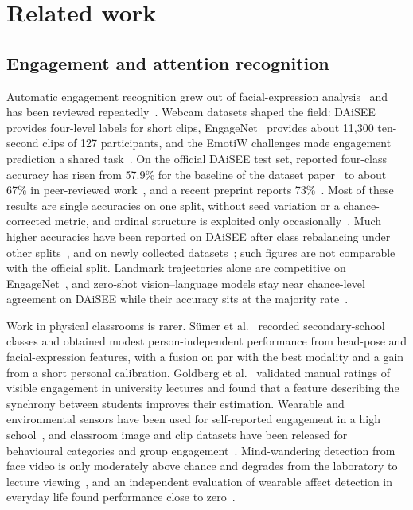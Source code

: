 \section{Related work}
\label{sec:related}

\subsection{Engagement and attention recognition}
Automatic engagement recognition grew out of facial-expression analysis~\cite{whitehill2014faces} and has been reviewed repeatedly~\cite{karimah2022automatic,booth2023engagement,qarbal2025student}. Webcam datasets shaped the field: DAiSEE~\cite{gupta2016daisee} provides four-level labels for short clips, EngageNet~\cite{singh2023engagenet} provides about 11{,}300 ten-second clips of 127 participants, and the EmotiW challenges made engagement prediction a shared task~\cite{dhall2018emotiw,dhall2020emotiw}. On the official DAiSEE test set, reported four-class accuracy has risen from 57.9\% for the baseline of the dataset paper~\cite{gupta2016daisee} to about 67\% in peer-reviewed work~\cite{liao2021dfstn,abedi2021resnettcn,selim2022students,abedi2024affectordinal,abedi2025supervised}, and a recent preprint reports 73\%~\cite{gothwal2025vibednet}. Most of these results are single accuracies on one split, without seed variation or a chance-corrected metric, and ordinal structure is exploited only occasionally~\cite{abedi2024affectordinal,abedi2025supervised}. Much higher accuracies have been reported on DAiSEE after class rebalancing under other splits~\cite{santoni2024automatic}, and on newly collected datasets~\cite{selim2022students}; such figures are not comparable with the official split. Landmark trajectories alone are competitive on EngageNet~\cite{yulius2026student}, and zero-shot vision--language models stay near chance-level agreement on DAiSEE while their accuracy sits at the majority rate~\cite{goyal2026zeroshot}.

Work in physical classrooms is rarer. S\"umer et al.~\cite{sumer2023multimodal} recorded secondary-school classes and obtained modest person-independent performance from head-pose and facial-expression features, with a fusion on par with the best modality and a gain from a short personal calibration. Goldberg et al.~\cite{goldberg2021attentive} validated manual ratings of visible engagement in university lectures and found that a feature describing the synchrony between students improves their estimation. Wearable and environmental sensors have been used for self-reported engagement in a high school~\cite{gao2020ngage}, and classroom image and clip datasets have been released for behavioural categories and group engagement~\cite{xu2023icapd,lu2025video}. Mind-wandering detection from face video is only moderately above chance and degrades from the laboratory to lecture viewing~\cite{buhler2025lab}, and an independent evaluation of wearable affect detection in everyday life found performance close to zero~\cite{dmello2023affect}.

